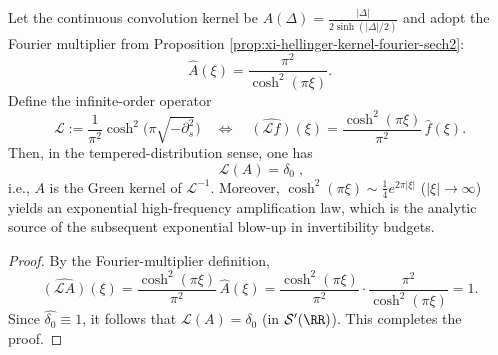 %

\begin{proposition}\label{prop:xi-hellinger-green-operator-cosh2}
Let the continuous convolution kernel be
\(
A(\Delta)=\frac{|\Delta|}{2\sinh(|\Delta|/2)}
\)
and adopt the Fourier multiplier from Proposition \ref{prop:xi-hellinger-kernel-fourier-sech2}:
\[
\widehat A(\xi)=\frac{\pi^2}{\cosh^2(\pi\xi)}.
\]
Define the infinite-order operator
\[
\mathcal L:=\frac{1}{\pi^2}\cosh^{2}\!\bigl(\pi\sqrt{-\partial_s^{2}}\bigr)
\quad\Longleftrightarrow\quad
\widehat{(\mathcal L f)}(\xi)=\frac{\cosh^{2}(\pi\xi)}{\pi^2}\,\widehat f(\xi).
\]
Then, in the tempered-distribution sense, one has
\[
\boxed{\;\mathcal L(A)=\delta_0\;},
\]
i.e., \(A\) is the Green kernel of \(\mathcal L^{-1}\).
Moreover, \(\cosh^{2}(\pi\xi)\sim \tfrac14 e^{2\pi|\xi|}\) (\(|\xi|\to\infty\)) yields an exponential high-frequency amplification law, which is the analytic source of the subsequent exponential blow-up in invertibility budgets.
\end{proposition}
\begin{proof}
By the Fourier-multiplier definition,
\[
\widehat{(\mathcal L A)}(\xi)
=\frac{\cosh^{2}(\pi\xi)}{\pi^2}\,\widehat A(\xi)
=\frac{\cosh^{2}(\pi\xi)}{\pi^2}\cdot\frac{\pi^2}{\cosh^{2}(\pi\xi)}
=1.
\]
Since \(\widehat{\delta_0}\equiv 1\), it follows that \(\mathcal L(A)=\delta_0\) (in \(\mathcal S'(\RR)\)). This completes the proof.
\end{proof}

